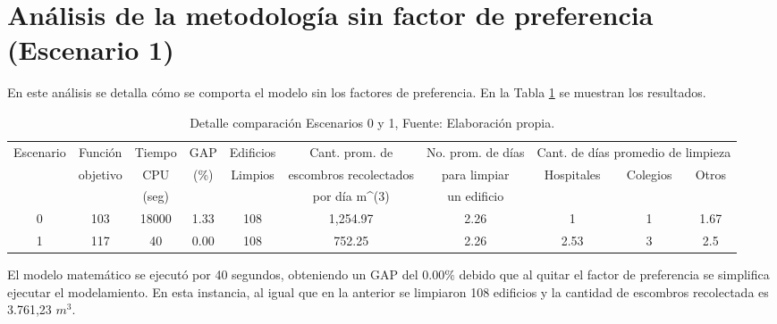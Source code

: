 \documentclass[letterpaper,conference]{IEEEtran}
\begin{document}
\section{Análisis de la metodología sin factor de preferencia (Escenario 1)}

En este análisis se detalla cómo se comporta el modelo sin los factores de preferencia. En la Tabla \ref{tab:comp01} se muestran los resultados.



\begin{table}[h!]
\resizebox{18cm}{!} {
\begin{tabular}{c|c|c|c|c|c|c|c|c|c}
\hline
\multirow{3}{*}{Escenario} & Función                   & Tiempo & GAP                   & Edificios                & Cant. prom. de                 & No. prom. de días & \multicolumn{3}{c|}{Cant. de días promedio de limpieza}                          \\ \cline{8-10} 
                           & \multirow{2}{*}{objetivo} & CPU    & \multirow{2}{*}{(\%)} & \multirow{2}{*}{Limpios} & escombros recolectados         & para limpiar      & \multirow{2}{*}{Hospitales} & \multirow{2}{*}{Colegios} & \multirow{2}{*}{Otros} \\
                           &                           & (seg)  &                       &                          & por día m\textasciicircum{}(3) & un edificio       &                             &                           &                        \\ \hline
0                          & 103                       & 18000  & 1.33                  & 108                      & 1,254.97                       & 2.26              & 1                           & 1                         & 1.67                   \\ 
1                          & 117                       & 40     & 0.00                  & 108                      & 752.25                         & 2.26              & 2.53                        & 3                         & 2.5                    \\ \hline
\end{tabular}
}
\caption{Detalle comparación Escenarios 0 y 1, Fuente: Elaboración propia. }
\label{tab:comp01}
\end{table}

El modelo matemático se ejecutó por 40 segundos, obteniendo un GAP del $0.00\%$ debido que al quitar el factor de preferencia se simplifica ejecutar el modelamiento. En esta instancia, al igual que en la anterior se limpiaron 108 edificios y la cantidad de escombros recolectada es 3.761,23 $m^{3}$.
\end{document}

